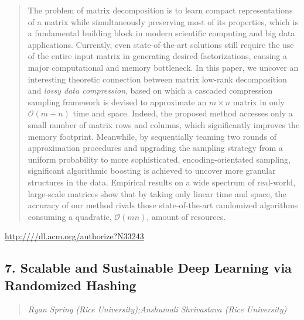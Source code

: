 \documentclass{article}
\begin{document}
\begin{quote}
The problem of matrix decomposition is to learn compact representations of a matrix while simultaneously preserving most of its properties, which is a fundamental building block in modern scientific computing and big data applications. Currently, even state-of-the-art solutions still require the use of the entire input matrix in generating desired factorizations, causing a major computational and memory bottleneck. In this paper, we uncover an interesting theoretic connection between matrix low-rank decomposition and \emph{ lossy data compression}, based on which a cascaded compression sampling framework is devised to approximate an $m\times n$ matrix in only $\mathcal{O}{(m+n)}$ time and space. Indeed, the proposed method accesses only a small number of matrix rows and columns, which significantly improves the memory footprint. Meanwhile, by sequentially teaming two rounds of approximation procedures and upgrading the sampling strategy from a uniform probability to more sophisticated, encoding-orientated sampling, significant algorithmic boosting is achieved to uncover more granular structures in the data. Empirical results on a wide spectrum of real-world, large-scale matrices show that by taking only linear time and space, the accuracy of our method rivals those state-of-the-art randomized algorithms consuming a quadratic, $\mathcal{O}(mn)$, amount of resources.
\end{quote}

\href{http:////dl.acm.org/authorize?N33243}{http:////dl.acm.org/authorize?N33243}

\subsection{7. Scalable and Sustainable Deep Learning via Randomized Hashing}

\begin{quote}
\footnotesize{\textit{Ryan Spring (Rice University);Anshumali Shrivastava (Rice University)}}

\end{quote}
\end{document}
